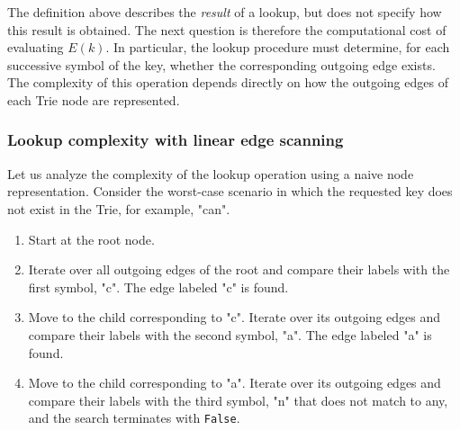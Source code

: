 \documentclass[11pt,twoside]{article}
\begin{document}
    \begin{table}[ht]
        \centering
        \setlength\tabcolsep{6pt}
        \caption{Sample evaluation of Exists (\(E\)) predicate.}
        \label{tab:queryExists}

    \end{table}
    \noindent

    The definition above describes the \textit{result} of a lookup, but does not specify how
    this result is obtained. The next question is therefore the computational cost of evaluating $E(k)$.
    In particular, the lookup procedure must determine, for each successive symbol of the key, whether
    the corresponding outgoing edge exists. The complexity of this operation depends directly on how
    the outgoing edges of each Trie node are represented.


    \subsubsection{Lookup complexity with linear edge scanning}
    \label{lookup-complexity-with-linear-edge-scanning}

    Let us analyze the complexity of the lookup operation \cite{largescalesearch2021} using a naive node representation.
    Consider the worst-case scenario in which the requested key does not exist in the Trie, for example, "can".

    \begin{enumerate}
        \def\labelenumi{\arabic{enumi}.}
        \item Start at the root node.
        \item Iterate over all outgoing edges of the root and compare their labels with the first symbol, "c".
        The edge labeled "c" is found.
        \item Move to the child corresponding to "c".
        Iterate over its outgoing edges and compare their labels with the second symbol, "a". The edge labeled "a" is found.
        \item Move to the child corresponding to "a".
        Iterate over its outgoing edges and compare their labels with the third symbol, "n" that does not match to any, and
        the search terminates with \texttt{False}.
    \end{enumerate}
\end{document}
